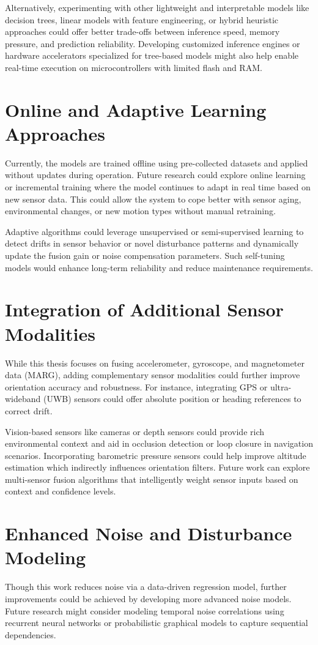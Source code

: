 \documentclass{iutbscthesis}
\begin{document}
Alternatively, experimenting with other lightweight and interpretable models like decision trees, linear models with feature engineering, or hybrid heuristic approaches could offer better trade-offs between inference speed, memory pressure, and prediction reliability. Developing customized inference engines or hardware accelerators specialized for tree-based models might also help enable real-time execution on microcontrollers with limited flash and RAM.

\section{Online and Adaptive Learning Approaches}
Currently, the models are trained offline using pre-collected datasets and applied without updates during operation. Future research could explore online learning or incremental training where the model continues to adapt in real time based on new sensor data. This could allow the system to cope better with sensor aging, environmental changes, or new motion types without manual retraining.

Adaptive algorithms could leverage unsupervised or semi-supervised learning to detect drifts in sensor behavior or novel disturbance patterns and dynamically update the fusion gain or noise compensation parameters. Such self-tuning models would enhance long-term reliability and reduce maintenance requirements.

\section{Integration of Additional Sensor Modalities}
While this thesis focuses on fusing accelerometer, gyroscope, and magnetometer data (MARG), adding complementary sensor modalities could further improve orientation accuracy and robustness. For instance, integrating GPS or ultra-wideband (UWB) sensors could offer absolute position or heading references to correct drift.

Vision-based sensors like cameras or depth sensors could provide rich environmental context and aid in occlusion detection or loop closure in navigation scenarios. Incorporating barometric pressure sensors could help improve altitude estimation which indirectly influences orientation filters. Future work can explore multi-sensor fusion algorithms that intelligently weight sensor inputs based on context and confidence levels.

\section{Enhanced Noise and Disturbance Modeling}
Though this work reduces noise via a data-driven regression model, further improvements could be achieved by developing more advanced noise models. Future research might consider modeling temporal noise correlations using recurrent neural networks or probabilistic graphical models to capture sequential dependencies.
\end{document}
